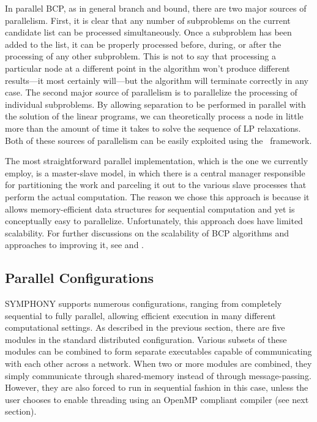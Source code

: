 In parallel BCP, as in general branch and bound, there are two major
sources of parallelism. First, it is clear that any number of
subproblems on the current candidate list can be processed
simultaneously. Once a subproblem has been added to the list, it can
be properly processed before, during, or after the processing of any
other subproblem. This is not to say that processing a particular node
at a different point in the algorithm won't produce different
results---it most certainly will---but the algorithm will terminate
correctly in any case. The second major source of parallelism is to
parallelize the processing of individual subproblems. By allowing
separation to be performed in parallel with the solution of the linear
programs, we can theoretically process a node in little more than the
amount of time it takes to solve the sequence of LP relaxations. Both
of these sources of parallelism can be easily exploited using the
\BB\ framework.

The most straightforward parallel implementation, which is the one we
currently employ, is a master-slave model, in which there is a central
manager responsible for partitioning the work and parceling it out to
the various slave processes that perform the actual computation. The
reason we chose this approach is because it allows memory-efficient
data structures for sequential computation and yet is conceptually
easy to parallelize. Unfortunately, this approach does have limited
scalability. For further discussions on the scalability of BCP algorithms and
approaches to improving it, see \cite{symphony1} and \cite{ALPS2}.


\subsection{Parallel Configurations}

SYMPHONY supports numerous configurations, ranging from completely
sequential to fully parallel, allowing efficient execution in many
different computational settings. As described in the previous
section, there are five modules in the standard distributed
configuration. Various subsets of these modules can be
combined to form separate executables capable of communicating
with each other across a network. When two or more modules are combined,
they simply communicate through shared-memory instead of through
message-passing. However, they are also forced to run in sequential
fashion in this case, unless the user chooses to enable threading
using an OpenMP compliant compiler (see next section). 

